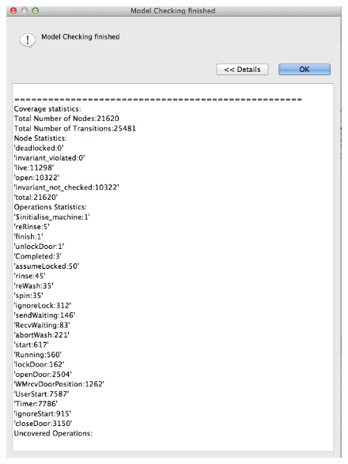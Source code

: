  \begin{figure}[!htbp]
  \centering
  \ifplastex
  \includegraphics[width=1024]{figures/image39.png}
  \else

\end{figure}
